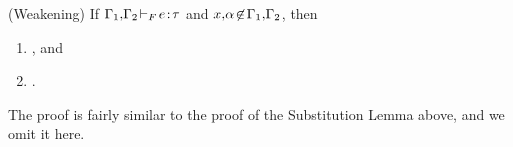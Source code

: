 \begin{lemma}(Weakening) \label{lem:weakeningF}
If ${\mathrm{\Gamma}_1,\!\mathrm{\Gamma}_2\!} \vdash_F {\!e\!} : {\!\tau}$ and 
   $x,\!\alpha\! \not\in\! {\mathrm{\Gamma}_1, \!\mathrm{\Gamma}_2}$,
then 
\begin{enumerate} 
    \item 
    , and
    \item 
    .
\end{enumerate}
\end{lemma}
%
The proof is fairly similar to the proof of the Substitution Lemma above,
and we omit it here.








